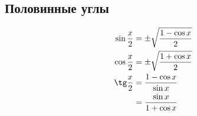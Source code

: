 \subsection*{Половинные углы}

\begin{align*}
  \sin \frac{x}{2}  &= \pm \sqrt{ \frac{1 - \cos x }{2} }\\
  \cos \frac{x}{2}  &= \pm \sqrt{ \frac{1 + \cos x }{2} }\\
  \tg \frac{x}{2}  &= \frac{1 - \cos x }{\sin x}\\
                    &= \frac{ \sin x }{ 1 + \cos x }
\end{align*}